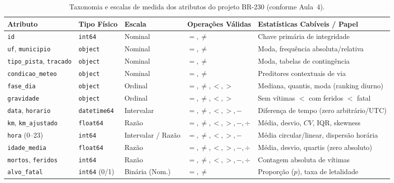 \documentclass[11pt,a4paper]{article}
\begin{document}
\begin{table}[H]
  \centering
  \small
  \renewcommand{\arraystretch}{1.25}
  \caption{Taxonomia e escalas de medida dos atributos do projeto BR-230 (conforme Aula~4).}
  \label{tab:taxonomia_escalas}
  \begin{tabularx}{\textwidth}{|>{\raggedright\arraybackslash\small}p{3.1cm}|>{\centering\arraybackslash}p{2.1cm}|>{\centering\arraybackslash}p{2.1cm}|>{\centering\arraybackslash}p{2.5cm}|L|}
    \hline
    \textbf{Atributo} & \textbf{Tipo Físico} & \textbf{Escala} & \textbf{Operações Válidas} & \textbf{Estatísticas Cabíveis / Papel} \\
    \hline
    \texttt{id} & \texttt{int64} & Nominal & $=, \neq$ & Chave primária de integridade \\
    \hline
    \texttt{uf}, \texttt{municipio} & \texttt{object} & Nominal & $=, \neq$ & Moda, frequência absoluta/relativa \\
    \hline
    \texttt{tipo\_pista}, \texttt{tracado} & \texttt{object} & Nominal & $=, \neq$ & Moda, tabelas de contingência \\
    \hline
    \texttt{condicao\_meteo} & \texttt{object} & Nominal & $=, \neq$ & Preditores contextuais de via \\
    \hline
    \texttt{fase\_dia} & \texttt{object} & Ordinal & $=, \neq, <, >$ & Mediana, quantis, moda (ranking diurno) \\
    \hline
    \texttt{gravidade} & \texttt{object} & Ordinal & $=, \neq, <, >$ & Sem vítimas $<$ com feridos $<$ fatal \\
    \hline
    \texttt{data}, \texttt{horario} & \texttt{datetime64} & Intervalar & $=, \neq, <, >, -$ & Diferença de tempo (zero arbitrário/UTC) \\
    \hline
    \texttt{km}, \texttt{km\_ajustado} & \texttt{float64} & Razão & $=, \neq, <, >, -, \div$ & Média, desvio, $CV$, IQR, skewness \\
    \hline
    \texttt{hora} (0--23) & \texttt{int64} & Intervalar / Razão & $=, \neq, <, >, -$ & Média circular/linear, dispersão horária \\
    \hline
    \texttt{idade\_media} & \texttt{float64} & Razão & $=, \neq, <, >, -, \div$ & Média, desvio, quartis (zero absoluto) \\
    \hline
    \texttt{mortos}, \texttt{feridos} & \texttt{int64} & Razão & $=, \neq, <, >, -, \div$ & Contagem absoluta de vítimas \\
    \hline
    \texttt{alvo\_fatal} & \texttt{int64} (0/1) & Binária (Nom.) & $=, \neq$ & Proporção ($p$), taxa de letalidade \\
    \hline
  \end{tabularx}
\end{table}
\end{document}

